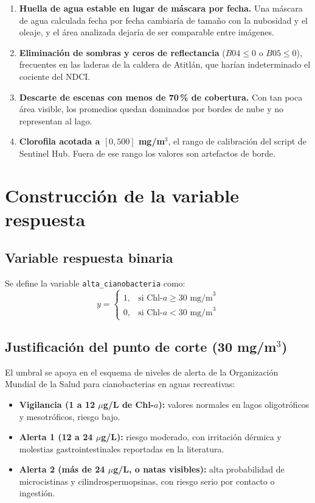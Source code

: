 \documentclass[11pt]{article}
\begin{document}
\begin{enumerate}
    \item \textbf{Huella de agua estable en lugar de máscara por fecha.} Una máscara de agua calculada fecha por fecha cambiaría de tamaño con la nubosidad y el oleaje, y el área analizada dejaría de ser comparable entre imágenes.
    \item \textbf{Eliminación de sombras y ceros de reflectancia} (\(B04 \le 0\) o \(B05 \le 0\)), frecuentes en las laderas de la caldera de Atitlán, que harían indeterminado el cociente del NDCI.
    \item \textbf{Descarte de escenas con menos de 70\,\% de cobertura.} Con tan poca área visible, los promedios quedan dominados por bordes de nube y no representan al lago.
    \item \textbf{Clorofila acotada a \([0, 500]\) mg/m\(^3\)}, el rango de calibración del script de Sentinel Hub. Fuera de ese rango los valores son artefactos de borde.
\end{enumerate}

\section{Construcción de la variable respuesta}
\label{sec:respuesta}

\subsection{Variable respuesta binaria}

Se define la variable \texttt{alta\_cianobacteria} como:
$$y = \begin{cases} 1, & \text{si Chl-}a \ge 30\text{ mg/m}^3 \\ 0, & \text{si Chl-}a < 30\text{ mg/m}^3 \end{cases}$$

\subsection{Justificación del punto de corte (30 mg/m\(^3\))}

El umbral se apoya en el esquema de niveles de alerta de la Organización Mundial de la Salud para cianobacterias en aguas recreativas:

\begin{itemize}
    \item \textbf{Vigilancia (1 a 12 \(\mu\)g/L de Chl-\(a\)):} valores normales en lagos oligotróficos y mesotróficos, riesgo bajo.
    \item \textbf{Alerta 1 (12 a 24 \(\mu\)g/L):} riesgo moderado, con irritación dérmica y molestias gastrointestinales reportadas en la literatura.
    \item \textbf{Alerta 2 (más de 24 \(\mu\)g/L, o natas visibles):} alta probabilidad de microcistinas y cilindrospermopsinas, con riesgo serio por contacto o ingestión.
\end{itemize}
\end{document}
